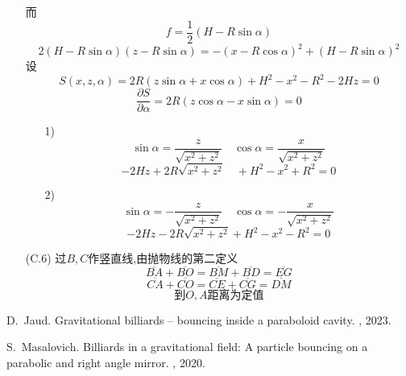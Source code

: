 \documentclass{article}
\begin{document}
\begin{itemize}
    而
    \[f=\dfrac12(H-R\sin\alpha)\]
    \[2(H-R\sin\alpha)(z-R\sin\alpha)=-(x-R\cos\alpha)^2+(H-R\sin\alpha)^2\]
    设\[S(x,z,\alpha)=2R(z\sin\alpha+x\cos\alpha)+H^2-x^2-R^2-2Hz=0\]
    \[\frac{\partial S}{\partial\alpha}=2R\left(z\cos\alpha-x\sin\alpha\right)=0\]
    \begin{itemize}
        \item[1)]\[\sin\alpha=\dfrac{z}{\sqrt{x^2+z^2}}\quad\cos\alpha=\dfrac{x}{\sqrt{x^2+z^2}}\]
        \[-2Hz+2R\sqrt{x^2+z^2}\quad+H^2-x^2+R^2=0\]
        \item[2)]\[\sin\alpha=-\dfrac{z}{\sqrt{x^2+z^2}}\quad\cos\alpha=-\dfrac{x}{\sqrt{x^2+z^2}}\]
        \[-2Hz-2R\sqrt{x^2+z^2}+H^2-x^2-R^2=0\]
    \end{itemize}
    \item[(C.6)]过$B,C$作竖直线,由抛物线的第二定义
    \[\overline{BA}+\overline{BO}=\overline{BM}+\overline{BD}=\overline{EG}\]
    \[\overline{CA}+\overline{CO}=\overline{CE}+\overline{CG}=\overline{DM}\]
    \[到O,A距离为定值\]
\end{itemize}
% 
% 
\begin{thebibliography}{99}  


    D.~Jaud.
    \newblock Gravitational billiards -- bouncing inside a paraboloid cavity.
    , 2023.
    
    S.~Masalovich.
    \newblock Billiards in a gravitational field: A particle bouncing on a
      parabolic and right angle mirror.
    , 2020.
    
    
    \end{thebibliography}
\end{document}
